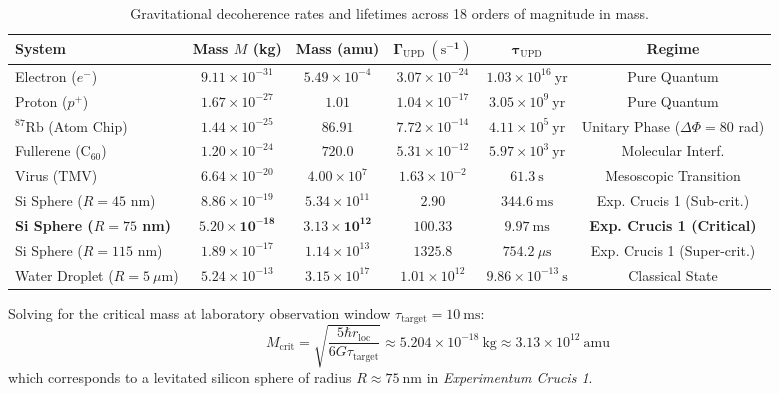 \documentclass[11pt,a4paper]{article}
\begin{document}
\begin{table}[h!]
\centering
\small
\begin{tabular}{lccccc}
\toprule
\textbf{System} & \textbf{Mass $M$ (kg)} & \textbf{Mass (amu)} & $\mathbf{\Gamma_{\mathrm{UPD}}\ (\mathrm{s}^{-1})}$ & $\mathbf{\tau_{\mathrm{UPD}}}$ & \textbf{Regime} \\
\midrule
Electron ($e^-$) & $9.11 \times 10^{-31}$ & $5.49 \times 10^{-4}$ & $3.07 \times 10^{-24}$ & $1.03 \times 10^{16}\ \mathrm{yr}$ & Pure Quantum \\
Proton ($p^+$) & $1.67 \times 10^{-27}$ & $1.01$ & $1.04 \times 10^{-17}$ & $3.05 \times 10^9\ \mathrm{yr}$ & Pure Quantum \\
$^{87}\mathrm{Rb}$ (Atom Chip) & $1.44 \times 10^{-25}$ & $86.91$ & $7.72 \times 10^{-14}$ & $4.11 \times 10^5\ \mathrm{yr}$ & Unitary Phase ($\Delta\Phi = 80$ rad) \\
Fullerene ($\mathrm{C}_{60}$) & $1.20 \times 10^{-24}$ & $720.0$ & $5.31 \times 10^{-12}$ & $5.97 \times 10^3\ \mathrm{yr}$ & Molecular Interf. \\
Virus (TMV) & $6.64 \times 10^{-20}$ & $4.00 \times 10^7$ & $1.63 \times 10^{-2}$ & $61.3\ \mathrm{s}$ & Mesoscopic Transition \\
Si Sphere ($R=45$ nm) & $8.86 \times 10^{-19}$ & $5.34 \times 10^{11}$ & $2.90$ & $344.6\ \mathrm{ms}$ & Exp. Crucis 1 (Sub-crit.) \\
\textbf{Si Sphere ($R=75$ nm)} & $\mathbf{5.20 \times 10^{-18}}$ & $\mathbf{3.13 \times 10^{12}}$ & $\mathbf{100.33}$ & $\mathbf{9.97\ \mathrm{ms}}$ & \textbf{Exp. Crucis 1 (Critical)} \\
Si Sphere ($R=115$ nm) & $1.89 \times 10^{-17}$ & $1.14 \times 10^{13}$ & $1325.8$ & $754.2\ \mu\mathrm{s}$ & Exp. Crucis 1 (Super-crit.) \\
Water Droplet ($R=5\ \mu$m) & $5.24 \times 10^{-13}$ & $3.15 \times 10^{17}$ & $1.01 \times 10^{12}$ & $9.86 \times 10^{-13}\ \mathrm{s}$ & Classical State \\
\bottomrule
\end{tabular}
\caption{Gravitational decoherence rates and lifetimes across 18 orders of magnitude in mass.}
\label{tab:masses}
\end{table}

Solving for the critical mass at laboratory observation window $\tau_{\mathrm{target}} = 10\ \mathrm{ms}$:
\begin{equation}
M_{\mathrm{crit}} = \sqrt{\frac{5 \hbar r_{\mathrm{loc}}}{6 G \tau_{\mathrm{target}}}} \approx 5.204 \times 10^{-18}\ \mathrm{kg} \approx 3.13 \times 10^{12}\ \mathrm{amu}
\end{equation}
which corresponds to a levitated silicon sphere of radius $R \approx 75\ \mathrm{nm}$ in \textit{Experimentum Crucis 1}.
\end{document}
